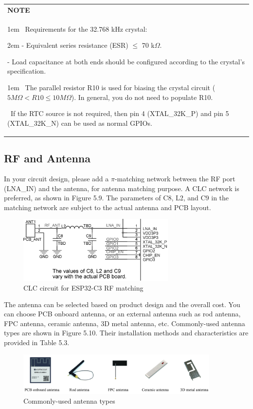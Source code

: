 \documentclass[a4paper,12pt,openany]{book}
\newcommand{\note}[2][NOTE]{ %
\vspace{6pt}
\begin{tabular}{b{\textwidth}}
\hline
\fontfamily{phv}\selectfont \textbf{#1}\\
\leftskip 1em #2\\
\hline
\end{tabular}
}
\begin{document}
\note{
\textbullet\ Requirements for the 32.768 kHz crystal: 

\leftskip 2em
- Equivalent series resistance (ESR) $\leq$ 70 k$\Omega$.

- Load capacitance at both ends should be configured according to the crystal’s specification.

\leftskip 1em
\textbullet\ The parallel resistor R10 is used for biasing the crystal circuit ($5 M\Omega < R10 \leq 10 M\Omega$). In general, you do not need to populate R10.

\textbullet\ If the RTC source is not required, then pin 4 (XTAL\_32K\_P) and pin 5 (XTAL\_32K\_N) can be used as normal GPIOs.}

\subsection{RF and Antenna}
In your circuit design, please add a $\pi$-matching network between the RF port (LNA\_IN) and the antenna, for antenna matching purpose. A CLC network is preferred, as shown in Figure 5.9. The parameters of C8, L2, and C9 in the matching network are subject to the actual antenna and PCB layout.

\begin{figure}[h!]
    \centering
    \includegraphics[width=0.7\textwidth]{D5Z/5-9}
    \caption{CLC circuit for ESP32-C3 RF matching}
\end{figure}

The antenna can be selected based on product design and the overall cost. You can choose PCB onboard antenna, or an external antenna such as rod antenna, FPC antenna, ceramic antenna, 3D metal antenna, etc. Commonly-used antenna types are shown in Figure 5.10. Their installation methods and characteristics are provided in Table 5.3.

\begin{figure}[h!]
    \centering
    \includegraphics[width=0.9\textwidth]{D5Z/5-10}
    \caption{Commonly-used antenna types}
\end{figure}
\end{document}
